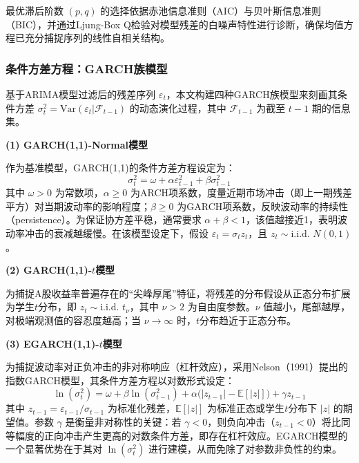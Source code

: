 \documentclass[12pt,a4paper]{ctexart}
\newcommand{\E}{\mathbb{E}}
\newcommand{\condvar}{\sigma_t^2}
\begin{document}
最优滞后阶数 $(p,q)$ 的选择依据赤池信息准则（AIC）与贝叶斯信息准则（BIC），并通过Ljung-Box Q检验对模型残差的白噪声特性进行诊断，确保均值方程已充分捕捉序列的线性自相关结构。

\subsubsection{条件方差方程：GARCH族模型}

基于ARIMA模型过滤后的残差序列 $\varepsilon_t$，本文构建四种GARCH族模型来刻画其条件方差 $\condvar = \mathrm{Var}(\varepsilon_t | \mathcal{F}_{t-1})$ 的动态演化过程，其中 $\mathcal{F}_{t-1}$ 为截至 $t-1$ 期的信息集。

\textbf{(1) GARCH(1,1)-Normal模型}

作为基准模型，GARCH(1,1)的条件方差方程设定为：
\begin{equation}\label{eq:garch}
\condvar = \omega + \alpha \varepsilon_{t-1}^2 + \beta \sigma_{t-1}^2
\end{equation}
其中 $\omega > 0$ 为常数项，$\alpha \ge 0$ 为ARCH项系数，度量近期市场冲击（即上一期残差平方）对当期波动率的影响程度；$\beta \ge 0$ 为GARCH项系数，反映波动率的持续性（persistence）。为保证协方差平稳，通常要求 $\alpha + \beta < 1$，该值越接近1，表明波动率冲击的衰减越缓慢。在该模型设定下，假设 $\varepsilon_t = \sigma_t z_t$，且 $z_t \sim \text{i.i.d. } N(0,1)$。

\textbf{(2) GARCH(1,1)-$t$模型}

为捕捉A股收益率普遍存在的“尖峰厚尾”特征，将残差的分布假设从正态分布扩展为学生$t$分布，即 $z_t \sim \text{i.i.d. } t_\nu$，其中 $\nu > 2$ 为自由度参数。$\nu$ 值越小，尾部越厚，对极端观测值的容忍度越高；当 $\nu \to \infty$ 时，$t$分布趋近于正态分布。

\textbf{(3) EGARCH(1,1)-$t$模型}

为捕捉波动率对正负冲击的非对称响应（杠杆效应），采用Nelson（1991）\cite{nelson1991}提出的指数GARCH模型，其条件方差方程以对数形式设定：
\begin{equation}\label{eq:egarch}
\ln(\condvar) = \omega + \beta \ln(\sigma_{t-1}^2) + \alpha \bigl( |z_{t-1}| - \E[|z|] \bigr) + \gamma z_{t-1}
\end{equation}
其中 $z_{t-1} = \varepsilon_{t-1} / \sigma_{t-1}$ 为标准化残差，$\E[|z|]$ 为标准正态或学生$t$分布下 $|z|$ 的期望值。参数 $\gamma$ 是衡量非对称性的关键：若 $\gamma < 0$，则负向冲击（$z_{t-1}<0$）将比同等幅度的正向冲击产生更高的对数条件方差，即存在杠杆效应。EGARCH模型的一个显著优势在于其对 $\ln(\condvar)$ 进行建模，从而免除了对参数非负性的约束。
\end{document}
